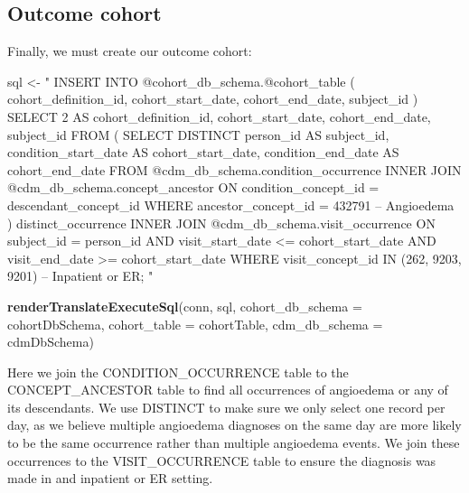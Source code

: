 \documentclass[11pt]{book}
\newenvironment{Shaded}{\begin{snugshade}}{\end{snugshade}}
\newcommand{\DataTypeTok}[1]{\textcolor[rgb]{0.13,0.29,0.53}{#1}}
\newcommand{\KeywordTok}[1]{\textcolor[rgb]{0.13,0.29,0.53}{\textbf{#1}}}
\newcommand{\NormalTok}[1]{#1}
\newcommand{\StringTok}[1]{\textcolor[rgb]{0.31,0.60,0.02}{#1}}
\theoremstyle{definition}
\theoremstyle{definition}
\theoremstyle{definition}
\theoremstyle{remark}
\begin{document}
\hypertarget{outcome-cohort}{%
\subsection{Outcome cohort}\label{outcome-cohort}}

Finally, we must create our outcome cohort:

\begin{Shaded}
\begin{Highlighting}[]
\NormalTok{sql <-}\StringTok{ "}
\StringTok{INSERT INTO @cohort_db_schema.@cohort_table (}
\StringTok{ cohort_definition_id,}
\StringTok{ cohort_start_date,}
\StringTok{ cohort_end_date,}
\StringTok{subject_id}
\StringTok{)}
\StringTok{SELECT 2 AS cohort_definition_id,}
\StringTok{  cohort_start_date,}
\StringTok{  cohort_end_date,}
\StringTok{  subject_id}
\StringTok{FROM (}
\StringTok{  SELECT DISTINCT person_id AS subject_id,}
\StringTok{    condition_start_date AS cohort_start_date,}
\StringTok{    condition_end_date AS cohort_end_date}
\StringTok{  FROM @cdm_db_schema.condition_occurrence}
\StringTok{  INNER JOIN @cdm_db_schema.concept_ancestor}
\StringTok{    ON condition_concept_id = descendant_concept_id}
\StringTok{  WHERE ancestor_concept_id = 432791 -- Angioedema}
\StringTok{) distinct_occurrence}
\StringTok{INNER JOIN @cdm_db_schema.visit_occurrence}
\StringTok{  ON subject_id = person_id}
\StringTok{  AND visit_start_date <= cohort_start_date}
\StringTok{  AND visit_end_date >= cohort_start_date}
\StringTok{WHERE visit_concept_id IN (262, 9203,}
\StringTok{    9201) -- Inpatient or ER;}
\StringTok{"}

\KeywordTok{renderTranslateExecuteSql}\NormalTok{(conn, sql,}
                          \DataTypeTok{cohort_db_schema =}\NormalTok{ cohortDbSchema,}
                          \DataTypeTok{cohort_table =}\NormalTok{ cohortTable,}
                          \DataTypeTok{cdm_db_schema =}\NormalTok{ cdmDbSchema)}
\end{Highlighting}
\end{Shaded}

Here we join the CONDITION\_OCCURRENCE table to the CONCEPT\_ANCESTOR table to find all occurrences of angioedema or any of its descendants. We use DISTINCT to make sure we only select one record per day, as we believe multiple angioedema diagnoses on the same day are more likely to be the same occurrence rather than multiple angioedema events. We join these occurrences to the VISIT\_OCCURRENCE table to ensure the diagnosis was made in and inpatient or ER setting.
\end{document}
